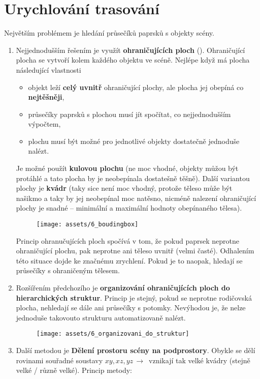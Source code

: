\section{Urychlování trasování}
Největším problémem je hledání průsečíků paprsků s objekty scény.
\begin{enumerate}
    \item Nejjednodušším řešením je využít \textbf{ohraničujících ploch} (). Ohraničující plocha se vytvoří kolem každého objektu ve scéně. Nejlépe když má plocha následující vlastnosti
          \begin{itemize}
              \item objekt leží \textbf{celý uvnitř} ohraničující plochy, ale plocha jej obepíná co \textbf{nejtěšněji},
              \item průsečíky paprsků s plochou musí jít spočítat, co nejjednodušším výpočtem,
              \item plochu musí být možné pro jednotlivé objekty dostatečně jednoduše nalézt.
          \end{itemize}
          Je možné použít \textbf{kulovou plochu} (ne moc vhodné, objekty můžou být protáhlé a tato plocha by je neobepínala dostatešně těšně). Další variantou plochy je \textbf{kvádr} (taky sice není moc vhodný, protože těleso může být našikmo a taky by jej neobepínal moc natěsno, nicméně nalezení ohraničující plochy je snadné -- minimální a maximální hodnoty obepínaného tělesa).
          \begin{figure}[H]
              \centering
              \texttt{[image: assets/6\_boudingbox]}
          \end{figure}
          Princip ohranučujících ploch spočívá v tom, že pokud paprsek neprotne ohraničující plochu, pak neprotne ani těleso uvnitř (velmi časté). Odhalením této situace dojde ke značnému zrychlení. Pokud je to naopak, hledají se průsečíky s ohraničeným tělesem.
    \item Rozšířením předchozího je \textbf{organizování ohraničujících ploch do hierarchických struktur}. Princip je stejný, pokud se neprotne rodičovská plocha, nehledají se dále ani průsečíky s potomky. Nevýhodou je, že nelze jednoduše takovouto strukturu automatizovaně nalézt.
          \begin{figure}[H]
              \centering
              \texttt{[image: assets/6\_organizovani\_do\_struktur]}
          \end{figure}
    \item Další metodou je \textbf{Dělení prostoru scény na podprostory}. Obykle se dělí rovinami souřadné soustavy $xy, xz, yz \,\to\,$ vznikají tak velké kvádry (stejně velké / různě velké). Princip metody:

\end{enumerate}

